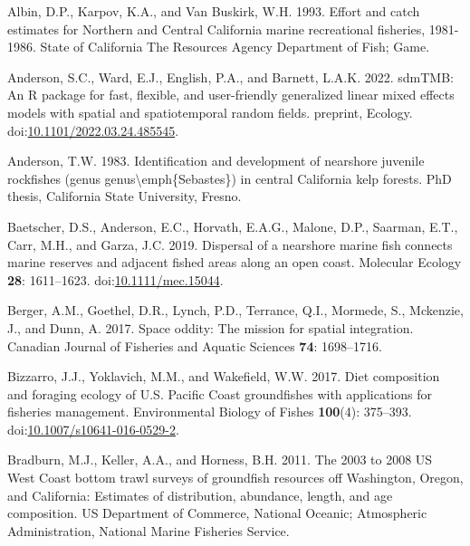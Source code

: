 \documentclass[11pt,
  english,
  letterpaper,
]{article}
\newlength{\cslhangindent}
\newenvironment{CSLReferences}[2] %
 {%
  \setlength{\parindent}{0pt}
  \ifodd #1 \everypar{\setlength{\hangindent}{\cslhangindent}}\ignorespaces\fi
  \ifnum #2 > 0
  \setlength{\parskip}{#2\baselineskip}
  \fi
 }%
 {}
\begin{document}
\hypertarget{refs}{}
\begin{CSLReferences}{1}{0}
\leavevmode{}%
Albin, D.P., Karpov, K.A., and Van Buskirk, W.H. 1993. Effort and catch estimates for {Northern} and {Central} {California} marine recreational fisheries, 1981-1986. State of California The Resources Agency Department of Fish; Game.

\leavevmode{}%
Anderson, S.C., Ward, E.J., English, P.A., and Barnett, L.A.K. 2022. {sdmTMB}: An {R} package for fast, flexible, and user-friendly generalized linear mixed effects models with spatial and spatiotemporal random fields. preprint, Ecology. doi:\href{https://doi.org/10.1101/2022.03.24.485545}{10.1101/2022.03.24.485545}.

\leavevmode{}%
Anderson, T.W. 1983. Identification and development of nearshore juvenile rockfishes (genus genus{\textbackslash{}}emph\{{Sebastes}\}) in central {California} kelp forests. PhD thesis, California State University, Fresno.

\leavevmode{}%
Baetscher, D.S., Anderson, E.C., Horvath, E.A.G., Malone, D.P., Saarman, E.T., Carr, M.H., and Garza, J.C. 2019. Dispersal of a nearshore marine fish connects marine reserves and adjacent fished areas along an open coast. Molecular Ecology \textbf{28}: 1611--1623. doi:\href{https://doi.org/10.1111/mec.15044}{10.1111/mec.15044}.

\leavevmode{}%
Berger, A.M., Goethel, D.R., Lynch, P.D., Terrance, Q.I., Mormede, S., Mckenzie, J., and Dunn, A. 2017. Space oddity: {The} mission for spatial integration. Canadian Journal of Fisheries and Aquatic Sciences \textbf{74}: 1698--1716.

\leavevmode{}%
Bizzarro, J.J., Yoklavich, M.M., and Wakefield, W.W. 2017. Diet composition and foraging ecology of {U}.{S}. {Pacific} {Coast} groundfishes with applications for fisheries management. Environmental Biology of Fishes \textbf{100}(4): 375--393. doi:\href{https://doi.org/10.1007/s10641-016-0529-2}{10.1007/s10641-016-0529-2}.

\leavevmode{}%
Bradburn, M.J., Keller, A.A., and Horness, B.H. 2011. The 2003 to 2008 {US} {West} {Coast} bottom trawl surveys of groundfish resources off {Washington}, {Oregon}, and {California}: Estimates of distribution, abundance, length, and age composition. US Department of Commerce, National Oceanic; Atmospheric Administration, National Marine Fisheries Service.


\end{CSLReferences}
\end{document}

